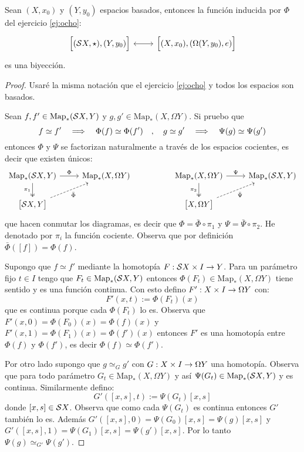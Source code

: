 
\begin{ejercicio}\label{ej:11}
Sean $(X,x_0)$ y $(Y,y_0)$ espacios basados, entonces la funci\'on inducida por $\Phi$
del ejercicio \ref{ej:ocho}:
\[
\begin{tikzcd}
	\Big[(\Ss X,\star),(Y,y_0)\Big] \arrow[r,leftrightarrow] &
	\Big[(X,x_0),(\Omega(Y,y_0),e)\Big]
\end{tikzcd}
\]
es una biyecci\'on.
\end{ejercicio}

\begin{proof}%

Usar\'e la misma notaci\'on que el ejercicio \ref{ej:ocho} y todos los espacios son basados.

Sean $f,f'\in\text{Map}_*(\mathcal{S} X,Y)$ y $g,g'\in\text{Map}_*(X,\Omega Y)$. Si pruebo que
\[
	f\simeq f' \quad\Longrightarrow\quad \Phi(f)\simeq\Phi(f') \quad , \quad 
	g\simeq g' \quad\Longrightarrow\quad \Psi(g)\simeq\Psi(g')
\]
entonces $\Phi$ y $\Psi$ se factorizan naturalmente a trav\'es de los espacios cocientes,
es decir que existen \'unicos:
\begin{equation}\label{cd:pasar_a_cocientes}
\begin{tikzcd}
	\text{Map}_*(\Ss X, Y) \arrow[r,"\Phi"] \arrow[d,twoheadrightarrow,"\pi_1"'] & \text{Map}_*(X,\Omega Y) & &
	\text{Map}_*(X, \Omega Y) \arrow[r,"\Psi"] \arrow[d,twoheadrightarrow,"\pi_2"'] & \text{Map}_*(\Ss X,Y) \\
	\big[\Ss X, Y\big] \arrow[ur,dashed,"\bar{\Phi}"'] & & &
	\big[ X,\Omega Y \big] \arrow[ur,dashed,"\bar{\Psi}"'] &
\end{tikzcd}
\end{equation}
que hacen conmutar los diagramas, es decir que $\Phi=\bar{\Phi}\circ\pi_1$ y $\Psi=\bar{\Psi}\circ\pi_2$.
He denotado por $\pi_i$ la funci\'on cociente. Observa que por definici\'on $\bar{\Phi}([f])=\Phi(f)$.

Supongo que $f\simeq f'$ mediante la homotop\'ia $F:\mathcal{S} X\times I \rightarrow Y$. Para un par\'ametro fijo $t\in I$
tengo que $F_t\in\text{Map}_*(\mathcal{S} X,Y)$ entonces $\Phi(F_t)\in\text{Map}_*(X,\Omega Y)$ tiene sentido y
es una funci\'on continua. Con esto defino $F':X\times I \rightarrow \Omega Y$ con:
\[
	F'(x,t):=\Phi(F_t)(x)
\]
que es continua porque cada $\Phi(F_t)$ lo es. Observa que $F'(x,0)=\Phi(F_0)(x)=\Phi(f)(x)$ y
$F'(x,1)=\Phi(F_1)(x)=\Phi(f')(x)$ entonces $F'$ es una homotop\'ia entre $\Phi(f)$ y $\Phi(f')$, es decir
$\Phi(f)\simeq\Phi(f')$.

Por otro lado supongo que $g\simeq_G g'$ con $G:X\times I\rightarrow \Omega Y$ una homotop\'ia. Observa que para
todo par\'ametro $G_t\in\text{Map}_*(X,\Omega Y)$ y as\'i $\Psi(G_t)\in\text{Map}_*(\mathcal{S} X,Y)$ y es continua.
Similarmente defino:
\[
	G'([x,s],t):=\Psi(G_t)[x,s]
\]
donde $[x,s]\in\mathcal{S} X$. Observa que como cada $\Psi(G_t)$ es continua entonces $G'$ tambi\'en lo es. Adem\'as
$G'([x,s],0)=\Psi(G_0)[x,s]=\Psi(g)[x,s]$ y $G'([x,s],1)=\Psi(G_1)[x,s]=\Psi(g')[x,s]$. Por lo tanto
$\Psi(g)\simeq_{G'}\Psi(g')$.


\end{proof}
